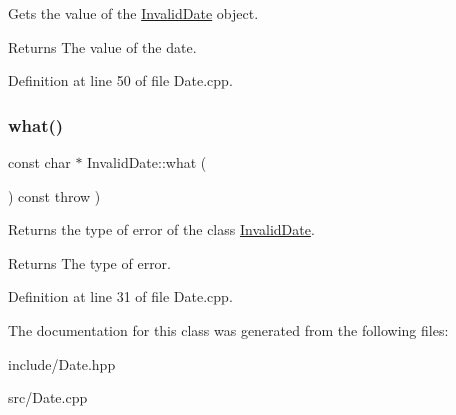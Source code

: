 Gets the value of the \hyperlink{classInvalidDate}{Invalid\+Date} object. \begin{DoxyReturn}{Returns}
The value of the date. 
\end{DoxyReturn}


Definition at line 50 of file Date.\+cpp.

\mbox{\label{classInvalidDate_ae3a017e8f670ebc051f4bbcb5edae47f}} 
\subsubsection{\texorpdfstring{what()}{what()}}
{\footnotesize\ttfamily const char $\ast$ Invalid\+Date\+::what (\begin{DoxyParamCaption}{ }\end{DoxyParamCaption}) const throw  ) \hspace{0.3cm}{\ttfamily [virtual]}}

Returns the type of error of the class \hyperlink{classInvalidDate}{Invalid\+Date}. \begin{DoxyReturn}{Returns}
The type of error. 
\end{DoxyReturn}


Definition at line 31 of file Date.\+cpp.



The documentation for this class was generated from the following files\+:\begin{DoxyCompactItemize}
\item 
include/Date.\+hpp\item 
src/Date.\+cpp\end{DoxyCompactItemize}
